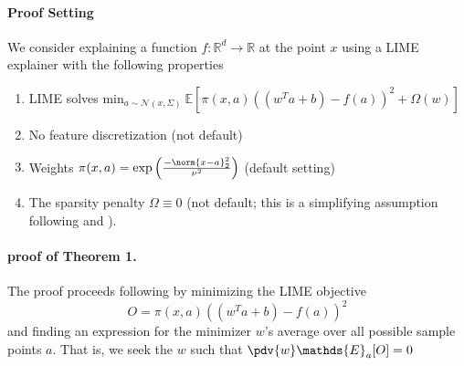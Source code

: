     \paragraph{Proof Setting}
        We consider explaining a function $f:\mathbb{R}^d \rightarrow \mathbb{R}$ at the point $x$ using a LIME explainer with the following properties 
        \begin{enumerate}
            \item LIME solves $\text{min}_{a\sim\mathcal{N}(x,\Sigma)}\ \mathds{E}[\pi(x,a)((w^Ta + b) - f(a))^2 + \Omega(w)]$
            \item No feature discretization (not default)
            \item Weights $\pi(x,a) = \text{exp}\left(\frac{-\norm{x - a}_2^2}{\nu^2}\right)$ (default setting)
            \item The sparsity penalty $\Omega \equiv 0$ (not default; this is a simplifying assumption following \citep{agarwal2021unification} and \citep{garreau20theoretical}). 
        \end{enumerate}
        
  \paragraph{proof of Theorem 1.}
        The proof proceeds following \citep{agarwal21clime} by minimizing the LIME objective
            \begin{equation*}
                O = \pi(x,a)((w^Ta + b) - f(a))^2
            \end{equation*}
        and finding an expression for the minimizer $w$'s average over all possible sample points $a$. 
        That is, we seek the $w$ such that $\pdv{w}\mathds{E}_a[O]=0$
  
